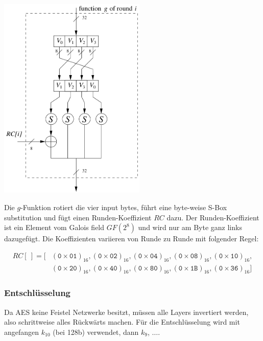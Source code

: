 \documentclass[
  10pt,
  a4paper,
]{article}
\begin{document}
\begin{multicols*}{2}
\begin{tcolorbox}
\begin{center}
\includegraphics[width=7cm,height=\textheight]{images/crypto/image-12.png}
\end{center}

Die \(g\)-Funktion rotiert die vier input bytes, führt eine byte-weise
S-Box substitution und fügt einen Runden-Koeffizient \(RC\) dazu. Der
Runden-Koeffizient ist ein Element vom Galois field \(GF(2^8)\) und wird
nur am Byte ganz links dazugefügt. Die Koeffizienten variieren von Runde
zu Runde mit folgender Regel:

\[
\begin{split}
RC[~] = [&(\mathtt{0{\times}01})_{16},(\mathtt{0{\times}02})_{16},(\mathtt{0{\times}04})_{16},(\mathtt{0{\times}08})_{16},(\mathtt{0{\times}10})_{16},\\
         &(\mathtt{0{\times}20})_{16},(\mathtt{0{\times}40})_{16},(\mathtt{0{\times}80})_{16},(\mathtt{0{\times}1B})_{16},(\mathtt{0{\times}36})_{16}]
\end{split}
\]

\end{tcolorbox}

\subsubsection{Entschlüsselung}\label{entschluxfcsselung}

Da AES keine Feistel Netzwerke besitzt, müssen alle Layers invertiert
werden, also schrittweise alles Rückwärts machen. Für die
Entschlüsselung wird mit angefangen \(k_{10}\) (bei 128b) verwendet,
dann \(k_9\), \(\ldots\).


\end{multicols*}
\end{document}
